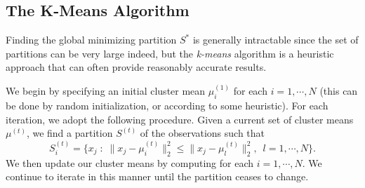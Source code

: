 \subsection*{The K-Means Algorithm}

Finding the global minimizing partition $S^*$ is generally intractable since the set of partitions can be very large indeed,
but the \emph{k-means} algorithm is a heuristic approach that can often provide reasonably accurate results.


We begin by specifying an initial cluster mean $\mu_i^{(1)}$ for each $i = 1, \cdots, N$ (this can be done by random initialization, or according to some heuristic).
For each iteration, we adopt the following procedure.
Given a current set of cluster means $\mu^{(t)}$, we find a partition $S^{(t)}$ of the observations such that
\begin{equation*}
S_{i}^{(t)} = \{x_j \; : \; \|x_j - \mu_{i}^{(t)}\|_2^2 \leq \|x_j - \mu_{l}^{(t)}\|_2^2,\,\,\,  l = 1, \cdots, N\}.
\end{equation*}
We then update our cluster means by computing for each $i = 1, \cdots, N$.
We continue to iterate in this manner until the partition ceases to change.


